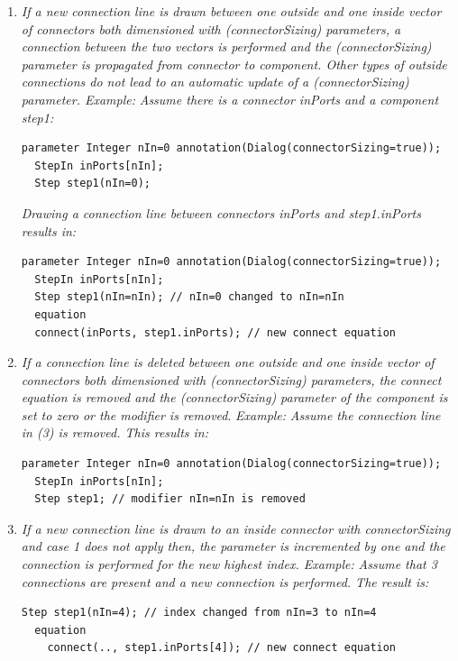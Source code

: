 \documentclass[10pt,a4paper]{report}
\renewcommand{\labelenumi}{\arabic{enumi}.}
\begin{document}
\begin{enumerate}
\def\labelenumi{\arabic{enumi}.}
\item
  \emph{If a new connection line is drawn between one outside and one
  inside vector of connectors both dimensioned with (connectorSizing)
  parameters, a connection between the two vectors is performed and the
  (connectorSizing) parameter is propagated from connector to component.
  Other types of outside connections do not lead to an automatic update
  of a (connectorSizing) parameter. Example:} \emph{Assume there is a
  connector inPorts and a component step1:} 
\begin{lstlisting}[language=modelica]
  parameter Integer nIn=0 annotation(Dialog(connectorSizing=true)); 
  StepIn inPorts[nIn];
  Step step1(nIn=0);
\end{lstlisting}
  \emph{Drawing a connection line between connectors inPorts and
  step1.inPorts results in:}
\begin{lstlisting}[language=modelica]
  parameter Integer nIn=0 annotation(Dialog(connectorSizing=true)); 
  StepIn inPorts[nIn];
  Step step1(nIn=nIn); // nIn=0 changed to nIn=nIn
  equation
  connect(inPorts, step1.inPorts); // new connect equation
\end{lstlisting}
\item
  \emph{If a connection line is deleted between one outside and one
  inside vector of connectors both dimensioned with (connectorSizing)
  parameters, the connect equation is removed and the (connectorSizing)
  parameter of the component is set to zero or the modifier is removed}.
  \emph{Example:} \emph{Assume the connection line in (3) is removed.
  This results in:}
\begin{lstlisting}[language=modelica]
  parameter Integer nIn=0 annotation(Dialog(connectorSizing=true));
  StepIn inPorts[nIn];
  Step step1; // modifier nIn=nIn is removed
\end{lstlisting}
\item
  \emph{If a new connection line is drawn to an inside connector with
  connectorSizing and case 1 does not apply then, the parameter is
  incremented by one and the connection is performed for the new highest
  index. Example:} \emph{Assume that 3 connections are present and a new
  connection is performed. The result is:}
\begin{lstlisting}[language=modelica]
    Step step1(nIn=4); // index changed from nIn=3 to nIn=4
  equation
    connect(.., step1.inPorts[4]); // new connect equation
\end{lstlisting}

\end{enumerate}
\end{document}
